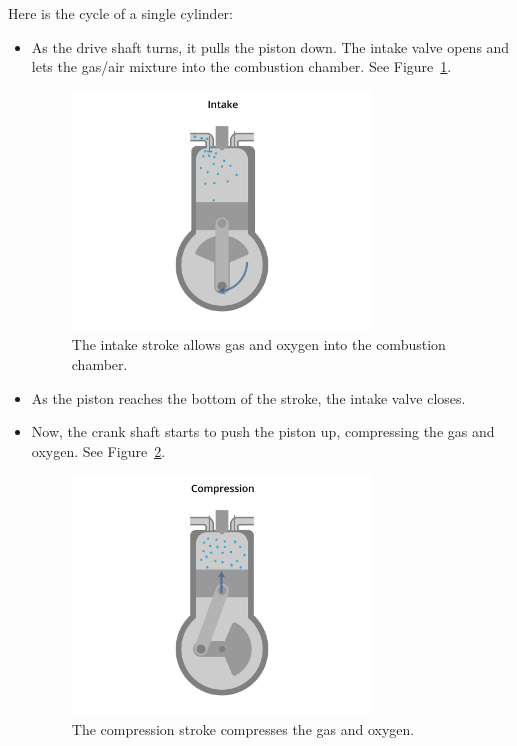Here is the cycle of a single cylinder:
\begin{itemize}

\item As the drive shaft turns, it pulls the piston down. The intake valve opens and lets the gas/air mixture into the combustion chamber. See Figure~\ref{fig:engine-09}.
\begin{figure}[htbp]
    \centering
    \includegraphics[width=0.75\textwidth]{engine-09.png}
    \caption{The intake stroke allows gas and oxygen into the combustion chamber.}
    \label{fig:engine-09}
\end{figure}

\item As the piston reaches the bottom of the stroke, the intake valve closes.
\item Now, the crank shaft starts to push the piston up, compressing the gas and oxygen. See Figure~\ref{fig:engine-10}.

\begin{figure}[htbp]
    \centering
    \includegraphics[width=0.75\textwidth]{engine-10.png}
    \caption{The compression stroke compresses the gas and oxygen.}
    \label{fig:engine-10}
\end{figure}


\end{itemize}

